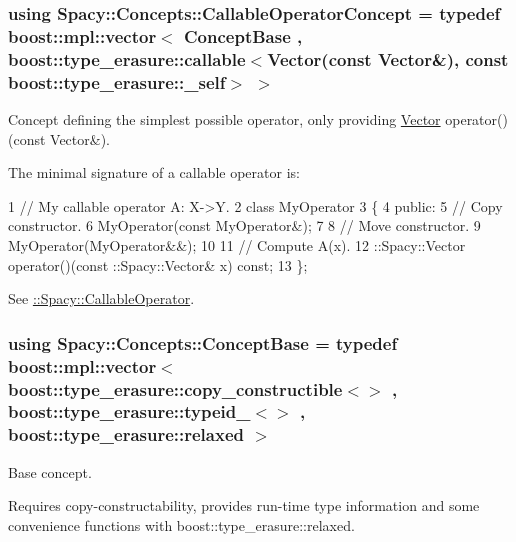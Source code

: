 \subsubsection[{Callable\+Operator\+Concept}]{\setlength{\rightskip}{0pt plus 5cm}using {\bf Spacy\+::\+Concepts\+::\+Callable\+Operator\+Concept} = typedef boost\+::mpl\+::vector$<$ {\bf Concept\+Base} , boost\+::type\+\_\+erasure\+::callable$<${\bf Vector}(const {\bf Vector}\&), const boost\+::type\+\_\+erasure\+::\+\_\+self$>$ $>$}\label{group__ConceptGroup_gadec0c664abaacc2065dadd8b11cc8d30_gadec0c664abaacc2065dadd8b11cc8d30}


Concept defining the simplest possible operator, only providing \hyperlink{classSpacy_1_1Vector}{Vector} operator()(const Vector\&). 

\label{group__ConceptGroup_gadec0c664abaacc2065dadd8b11cc8d30_CallableOperatorConceptAnchor}%
\hypertarget{group__ConceptGroup_gadec0c664abaacc2065dadd8b11cc8d30_CallableOperatorConceptAnchor}{}%
The minimal signature of a callable operator is\+: 
\begin{DoxyCode}
1 // My callable operator A: X->Y.
2 class MyOperator
3 \{
4 public:
5   // Copy constructor.
6   MyOperator(const MyOperator&);
7 
8   // Move constructor.
9   MyOperator(MyOperator&&);
10 
11   // Compute A(x).
12   ::Spacy::Vector operator()(const ::Spacy::Vector& x) const;
13 \};
\end{DoxyCode}


See \hyperlink{group__SpacyGroup_ga2b74020d806ad800795cdd97dab3466f_CallableOperatorAnchor}{\+:\+:Spacy\+:\+:Callable\+Operator}. \hypertarget{group__ConceptGroup_ga63426675cc05ccce03ead56a4fa90d96_ga63426675cc05ccce03ead56a4fa90d96}{}
\subsubsection[{Concept\+Base}]{\setlength{\rightskip}{0pt plus 5cm}using {\bf Spacy\+::\+Concepts\+::\+Concept\+Base} = typedef boost\+::mpl\+::vector$<$ boost\+::type\+\_\+erasure\+::copy\+\_\+constructible$<$$>$ , boost\+::type\+\_\+erasure\+::typeid\+\_\+$<$$>$ , boost\+::type\+\_\+erasure\+::relaxed $>$}\label{group__ConceptGroup_ga63426675cc05ccce03ead56a4fa90d96_ga63426675cc05ccce03ead56a4fa90d96}


Base concept. 

Requires copy-\/constructability, provides run-\/time type information and some convenience functions with boost\+::type\+\_\+erasure\+::relaxed. \hypertarget{group__ConceptGroup_gaa7ef0ce2d66b0610035541b580564b11_gaa7ef0ce2d66b0610035541b580564b11}{}
